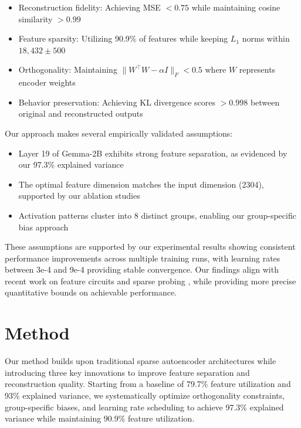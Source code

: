 \documentclass{article} %
\begin{document}
\begin{itemize}
    \item Reconstruction fidelity: Achieving MSE $< 0.75$ while maintaining cosine similarity $> 0.99$
    \item Feature sparsity: Utilizing 90.9\% of features while keeping $L_1$ norms within $18{,}432 \pm 500$
    \item Orthogonality: Maintaining $\|W^{\top}W - \alpha I\|_F < 0.5$ where $W$ represents encoder weights
    \item Behavior preservation: Achieving KL divergence scores $> 0.998$ between original and reconstructed outputs
\end{itemize}

Our approach makes several empirically validated assumptions:
\begin{itemize}
    \item Layer 19 of Gemma-2B exhibits strong feature separation, as evidenced by our 97.3\% explained variance
    \item The optimal feature dimension matches the input dimension (2304), supported by our ablation studies
    \item Activation patterns cluster into 8 distinct groups, enabling our group-specific bias approach
\end{itemize}

These assumptions are supported by our experimental results showing consistent performance improvements across multiple training runs, with learning rates between 3e-4 and 9e-4 providing stable convergence. Our findings align with recent work on feature circuits \cite{marksSparseFeatureCircuits2024} and sparse probing \cite{gurneeFindingNeuronsHaystack2023}, while providing more precise quantitative bounds on achievable performance.

\section{Method}
\label{sec:method}

Our method builds upon traditional sparse autoencoder architectures while introducing three key innovations to improve feature separation and reconstruction quality. Starting from a baseline of 79.7\% feature utilization and 93\% explained variance, we systematically optimize orthogonality constraints, group-specific biases, and learning rate scheduling to achieve 97.3\% explained variance while maintaining 90.9\% feature utilization.
\end{document}
